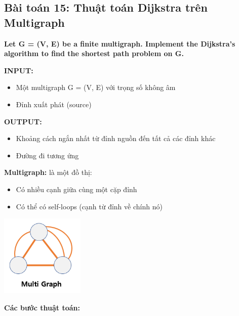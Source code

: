 \documentclass[12pt,a4paper]{article}
\begin{document}
\subsection{Bài toán 15: Thuật toán Dijkstra trên Multigraph}

\begin{problembox}
    \textbf{Let G = (V, E) be a finite multigraph. Implement the Dijkstra's algorithm to find the shortest path problem on G.}
\end{problembox}


\textbf{INPUT:}
\begin{itemize}[label=\textbullet]
    \item Một multigraph G = (V, E) với trọng số không âm
    \item Đỉnh xuất phát (source)
\end{itemize}

\textbf{OUTPUT:}
\begin{itemize}[label=\textbullet]
    \item Khoảng cách ngắn nhất từ đỉnh nguồn đến tất cả các đỉnh khác
    \item Đường đi tương ứng
\end{itemize}

\textbf{Multigraph:} là một đồ thị:
\begin{itemize}[label=\textbullet]
    \item Có nhiều cạnh giữa cùng một cặp đỉnh
    \item Có thể có self-loops (cạnh từ đỉnh về chính nó)
\end{itemize}
{\centering
    \includegraphics[width=0.3\textwidth]{assets/image/multigraph.png}
\par}
\vspace{1cm}

\textbf{Các bước thuật toán:}
\end{document}
